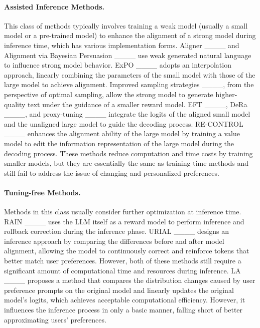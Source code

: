 \paragraph{\textbf{Assisted Inference Methods.}}
This class of methods typically involves training a weak model (usually a small model or a pre-trained model) to enhance the alignment of a strong model during inference time, which has various implementation forms. 
Aligner ____ and Alignment via Bayesian Persuasion ____ use weak generated natural language to influence strong model behavior.
ExPO ____ adopts an interpolation approach, linearly combining the parameters of the small model with those of the large model to achieve alignment. Improved sampling strategies ____, from the perspective of optimal sampling, allow the strong model to generate higher-quality text under the guidance of a smaller reward model.
EFT ____, DeRa ____, and proxy-tuning ____ integrate the logits of the aligned small model and the unaligned large model to guide the decoding process. RE-CONTROL ____ enhances the alignment ability of the large model by training a value model to edit the information representation of the large model during the decoding process.
These methods reduce computation and time costs by training smaller models, but they are essentially the same as training-time methods and still fail to address the issue of changing and personalized preferences.

\vspace{-1.5ex}

\paragraph{\textbf{Tuning-free Methods.}}
Methods in this class usually consider further optimization at inference time. RAIN ____ uses the LLM itself as a reward model to perform inference and rollback correction during the inference phase. URIAL ____ designs an inference approach by comparing the differences before and after model alignment, allowing the model to continuously correct and reinforce tokens that better match user preferences. However, both of these methods still require a significant amount of computational time and resources during inference. LA ____ proposes a method that compares the distribution changes caused by user preference prompts on the original model and linearly updates the original model's logits, which achieves acceptable computational efficiency. However, it influences the inference process in only a basic manner, falling short of better approximating users' preferences. 

\vspace{-1.5ex}